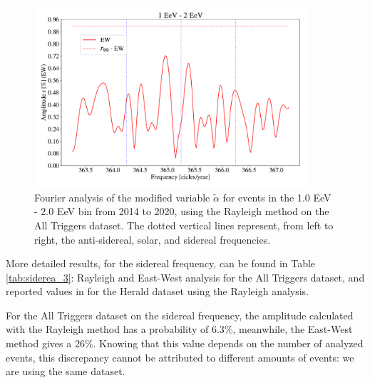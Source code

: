 \documentclass[12pt, doublespace, oneside]{article}
\begin{document}
\begin{figure}[H]
    \begin{small}
        \begin{center}
            \vspace*{-0.21 cm}
            \includegraphics[width=0.9\textwidth]{Figs/plot_bin_3_barrido_v3_EW.pdf}
            \vspace*{-1 cm}
        \end{center}
        \caption{Fourier analysis of the modified variable $\tilde{\alpha}$ for events in the 1.0 EeV - 2.0 EeV bin from 2014 to 2020, using the Rayleigh method on the All Triggers dataset. The dotted vertical lines represent, from left to right, the anti-sidereal, solar, and sidereal frequencies.}
        \label{fig:tercer_barrido}
    \end{small}
\end{figure}    

More detailed results, for the sidereal frequency, can be found in Table  \ref{tab:siderea_3}: Rayleigh and East-West analysis for the All Triggers dataset, and reported values in \cite{Aab_2020} for the Herald dataset using the Rayleigh analysis.  



For the All Triggers dataset on the sidereal frequency, the amplitude calculated with the Rayleigh method has a probability of 6.3\%, meanwhile, the East-West method gives a 26\%. Knowing that this value depends on the number of analyzed events, this discrepancy cannot be attributed to different amounts of events: we are using the same dataset. 

    
\end{document}
